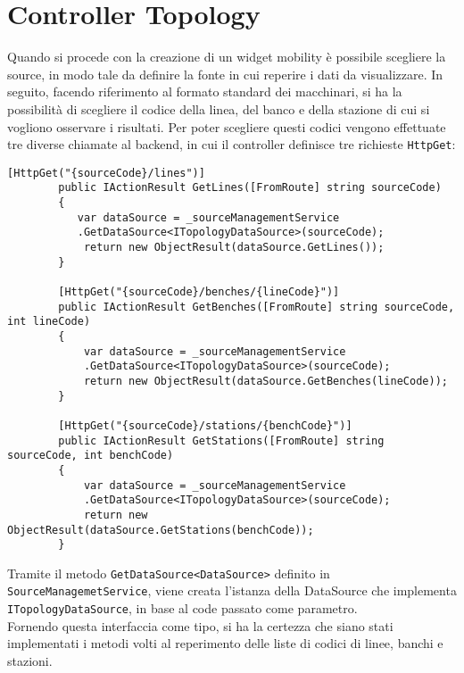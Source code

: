 \section{Controller Topology}
Quando si procede con la creazione di un widget mobility è possibile scegliere la source, in modo tale da definire la fonte in cui reperire i dati da visualizzare. In seguito,  facendo riferimento al formato standard dei macchinari, si ha la possibilità di scegliere il codice della linea, del banco e della stazione di cui si vogliono osservare i risultati.
Per poter scegliere questi codici vengono effettuate tre diverse chiamate al backend, in cui il controller definisce tre richieste \verb|HttpGet|: \\
\begin{lstlisting}[caption={TopologyController.cs}, style=javaScriptCode, label={lst:cacheattribute}]
        [HttpGet("{sourceCode}/lines")]
        public IActionResult GetLines([FromRoute] string sourceCode)
        {
           var dataSource = _sourceManagementService
           .GetDataSource<ITopologyDataSource>(sourceCode);
            return new ObjectResult(dataSource.GetLines());
        }

        [HttpGet("{sourceCode}/benches/{lineCode}")]
        public IActionResult GetBenches([FromRoute] string sourceCode, int lineCode)
        {
            var dataSource = _sourceManagementService
            .GetDataSource<ITopologyDataSource>(sourceCode);
            return new ObjectResult(dataSource.GetBenches(lineCode));
        }

        [HttpGet("{sourceCode}/stations/{benchCode}")]
        public IActionResult GetStations([FromRoute] string sourceCode, int benchCode)
        {
            var dataSource = _sourceManagementService
            .GetDataSource<ITopologyDataSource>(sourceCode);
            return new ObjectResult(dataSource.GetStations(benchCode));
        }
\end{lstlisting}
Tramite il metodo \verb|GetDataSource<DataSource>| definito in \verb|SourceManagemetService|, viene creata l'istanza della DataSource che implementa \verb|ITopologyDataSource|, in base al code passato come parametro.\\
Fornendo questa interfaccia come tipo, si ha la certezza che siano stati implementati i metodi volti al reperimento delle liste di codici di linee, banchi e stazioni.